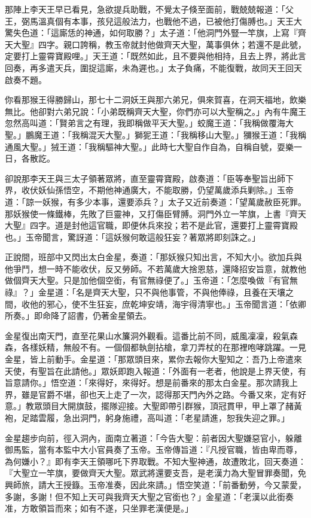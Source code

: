 那陣上李天王早已看見，急欲提兵助戰，不覺太子倏至面前，戰兢兢報道：「父王，弼馬溫真個有本事，孩兒這般法力，也戰他不過，已被他打傷膊也。」天王大驚失色道：「這廝恁的神通，如何取勝？」太子道：「他洞門外豎一竿旗，上寫『齊天大聖』四字。親口誇稱，教玉帝就封他做齊天大聖，萬事俱休；若還不是此號，定要打上靈霄寶殿哩。」天王道：「既然如此，且不要與他相持，且去上界，將此言回奏，再多遣天兵，圍捉這廝，未為遲也。」太子負痛，不能復戰，故同天王回天啟奏不題。

你看那猴王得勝歸山，那七十二洞妖王與那六弟兄，俱來賀喜，在洞天福地，飲樂無比。他卻對六弟兄說：「小弟既稱齊天大聖，你們亦可以大聖稱之。」內有牛魔王忽然高叫道：「賢弟言之有理，我即稱做平天大聖。」蛟魔王道：「我稱做覆海大聖。」鵬魔王道：「我稱混天大聖。」獅狔王道：「我稱移山大聖。」獼猴王道：「我稱通風大聖。」狨王道：「我稱驅神大聖。」此時七大聖自作自為，自稱自號，耍樂一日，各散訖。

卻說那李天王與三太子領著眾將，直至靈霄寶殿，啟奏道：「臣等奉聖旨出師下界，收伏妖仙孫悟空，不期他神通廣大，不能取勝，仍望萬歲添兵剿除。」玉帝道：「諒一妖猴，有多少本事，還要添兵？」太子又近前奏道：「望萬歲赦臣死罪。那妖猴使一條鐵棒，先敗了巨靈神，又打傷臣臂膊。洞門外立一竿旗，上書『齊天大聖』四字。道是封他這官職，即便休兵來投；若不是此官，還要打上靈霄寶殿也。」玉帝聞言，驚訝道：「這妖猴何敢這般狂妄？著眾將即刻誅之。」

正說間，班部中又閃出太白金星，奏道：「那妖猴只知出言，不知大小。欲加兵與他爭鬥，想一時不能收伏，反又勞師。不若萬歲大捨恩慈，還降招安旨意，就教他做個齊天大聖。只是加他個空銜，有官無祿便了。」玉帝道：「怎麼喚做『有官無祿』？」金星道：「名是齊天大聖，只不與他事管，不與他俸祿，且養在天壤之間，收他的邪心，使不生狂妄，庶乾坤安靖，海宇得清寧也。」玉帝聞言道：「依卿所奏。」即命降了詔書，仍著金星領去。

金星復出南天門，直至花果山水簾洞外觀看。這番比前不同，威風凜凜，殺氣森森，各樣妖精，無般不有。一個個都執劍拈槍，拿刀弄杖的在那裡咆哮跳躍。一見金星，皆上前動手。金星道：「那眾頭目來，累你去報你大聖知之：吾乃上帝遣來天使，有聖旨在此請他。」眾妖即跑入報道：「外面有一老者，他說是上界天使，有旨意請你。」悟空道：「來得好，來得好。想是前番來的那太白金星。那次請我上界，雖是官爵不堪，卻也天上走了一次，認得那天門內外之路。今番又來，定有好意。」教眾頭目大開旗鼓，擺隊迎接。大聖即帶引群猴，頂冠貫甲，甲上罩了赭黃袍，足踏雲履，急出洞門，躬身施禮，高叫道：「老星請進，恕我失迎之罪。」

金星趨步向前，徑入洞內，面南立著道：「今告大聖：前者因大聖嫌惡官小，躲離御馬監，當有本監中大小官員奏了玉帝。玉帝傳旨道：『凡授官職，皆由卑而尊，為何嫌小？』即有李天王領哪吒下界取戰。不知大聖神通，故遭敗北，回天奏道：『大聖立一竿旗，要做齊天大聖。眾武將還要支吾，是老漢力為大聖冒罪奏聞，免興師旅，請大王授籙。玉帝准奏，因此來請。」悟空笑道：「前番動勞，今又蒙愛，多謝，多謝！但不知上天可與我齊天大聖之官銜也？」金星道：「老漢以此銜奏准，方敢領旨而來；如有不遂，只坐罪老漢便是。」

